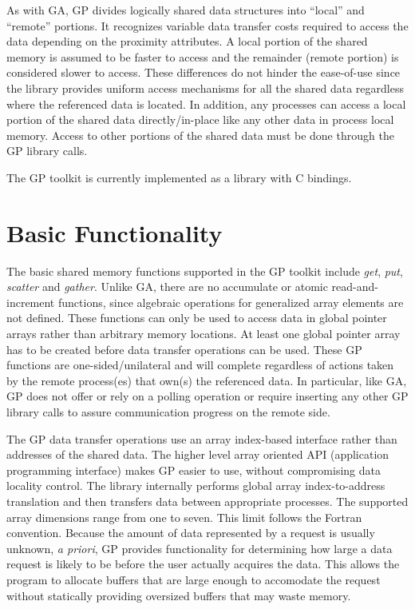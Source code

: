 As with GA, GP divides logically shared data structures into ``local'' and ``remote''
portions. It recognizes variable data transfer costs required to access the
data depending on the proximity attributes. A local portion of the shared
memory is assumed to be faster to access and the remainder (remote portion) is
considered slower to access. These differences do not hinder the ease-of-use
since the library provides uniform access mechanisms for all the shared data
regardless where the referenced data is located. In addition, any processes can
access a local portion of the shared data directly/in-place like any other data
in process local memory. Access to other portions of the shared data must be
done through the GP library calls. 

The GP toolkit is currently implemented as a library with C bindings.

\section{Basic Functionality}

The basic shared memory functions supported in the GP toolkit include \emph{get},
\emph{put}, \emph{scatter} and \emph{gather}. Unlike GA, there are no accumulate
or atomic read-and-increment functions, since algebraic operations for generalized array
elements are not defined. These functions can only be used to access data in global
pointer arrays rather than arbitrary memory locations. At least one global
pointer array has to be created before data transfer operations can be used.
These GP functions are one-sided/unilateral and will complete regardless of actions
taken by the remote process(es) that own(s) the referenced data. In particular, like GA,
GP does not offer or rely on a polling operation or require inserting any other GP library
calls to assure communication progress on the remote side. 

The GP data transfer operations use an array index-based interface rather than
addresses of the shared data.  The
higher level array oriented API (application programming interface) makes GP
easier to use, without compromising data locality control. The
library internally performs global array index-to-address translation and then
transfers data between appropriate processes.
The supported array dimensions range from one to seven. This limit follows the
Fortran convention. Because the amount of data represented by a request is
usually unknown, \emph{a priori}, GP provides functionality for determining how
large a data request is likely to be before the user actually acquires the data.
This allows the program to allocate buffers that are large enough to accomodate
the request without statically providing oversized buffers that may waste
memory.
